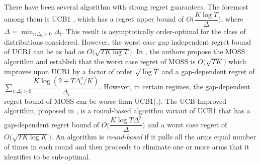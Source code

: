 	There have been several algorithm with strong regret guarantees. The foremost among them is UCB1 \cite{auer2002finite}, which has a regret upper bound of $O\bigg(\dfrac{K\log T}{\Delta}\bigg)$, where $\Delta = \min_{i:\Delta_i>0} \Delta_i$. This result is asymptotically order-optimal for the class of distributions considered. However, the worst case gap independent regret bound of UCB1  can be as bad as $O \bigg(\sqrt{TK\log T}\bigg)$.  In \cite{audibert2009minimax}, the authors propose the MOSS algorithm and establish that the worst case regret of MOSS is $O\bigg(\sqrt{TK}\bigg)$ which improves upon UCB1 by a factor of order $\sqrt{\log T}$ and a gap-dependent regret of $\sum_{i:\Delta_{i}>0}\dfrac{K\log(2+T\Delta_{i}^{2}/K)}{\Delta_{i}}$. However, in certain regimes, the gap-dependent regret bound of MOSS can be worse than UCB1(\cite{audibert2009minimax},\cite{lattimore2015optimally}). The UCB-Improved algorithm, proposed in \cite{auer2010ucb}, is a round-based algorithm variant of UCB1 that 
has a gap-dependent regret bound of $O\bigg(\dfrac{K\log T\Delta^{2}}{\Delta}\bigg)$ and a worst case regret of $O\bigg(\sqrt{TK\log K}\bigg)$. An algorithm is \textit{round-based} if it pulls all the arms equal number of times in each round and then proceeds to eliminate one or more arms that it identifies to be sub-optimal.

	
